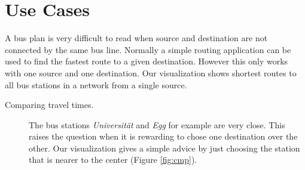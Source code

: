 \documentclass[a4paper, twocolumn,
final
]{article}
\begin{document}
\section*{Use Cases}
A bus plan is very difficult to read when source and destination are not connected by
the same bus line. Normally a simple routing application can be used to find the fastest
route to a given destination. However this only works with one source and one destination. Our
visualization shows shortest routes to all bus stations in a network from a single source.
\begin{description}
\item[Comparing travel times.]
The bus stations \emph{Universität} and \emph{Egg} for example are very close. This raises the question when it is rewarding to chose one destination over the other. Our visualization gives a simple advice by just choosing
the station that is nearer to the center (Figure \ref{fig:cmp}).


\end{description}
\end{document}
